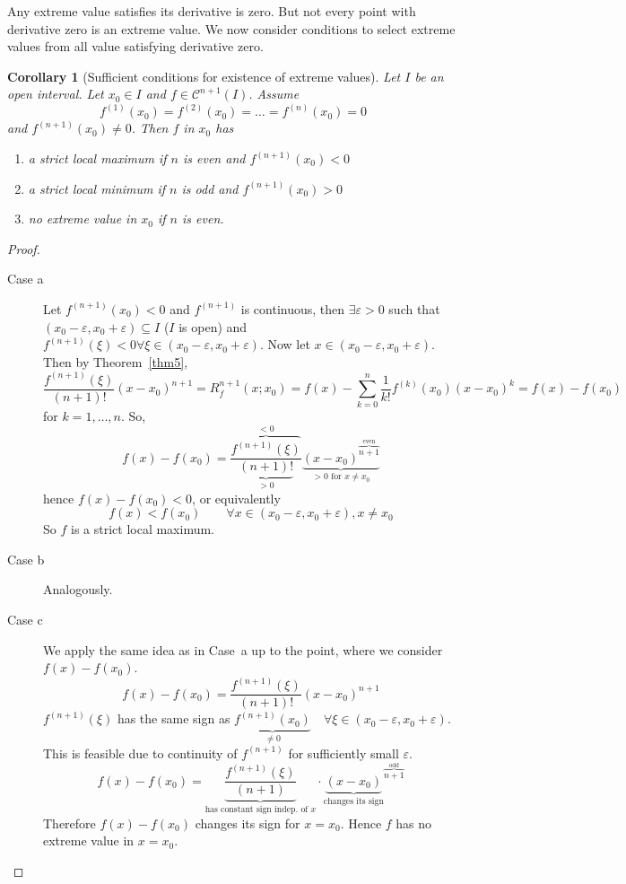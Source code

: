 \documentclass{article}
\newtheorem*{corollary}{Corollary}%
\begin{document}
Any extreme value satisfies its derivative is zero. But not every point with derivative zero is an extreme value.
We now consider conditions to select extreme values from all value satisfying derivative zero.

\begin{corollary}[Sufficient conditions for existence of extreme values]
  Let $I$ be an open interval. Let $x_0 \in I$ and $f \in \mathcal C^{n+1}(I)$. Assume
  \[ f^{(1)}(x_0) = f^{(2)}(x_0) = \dots = f^{(n)}(x_0) = 0 \] %
  and $f^{(n+1)}(x_0) \neq 0$. Then $f$ in $x_0$ has
  \begin{enumerate}
    \item a strict local maximum if $n$ is even and $f^{(n+1)}(x_0) < 0$
    \item a strict local minimum if $n$ is odd and $f^{(n+1)}(x_0) > 0$
    \item no extreme value in $x_0$ if $n$ is even.
  \end{enumerate}
\end{corollary}

\begin{proof}
  \begin{description}
    \item[Case a]
      Let $f^{(n+1)}(x_0) < 0$ and $f^{(n+1)}$ is continuous,
      then $\exists \varepsilon > 0$ such that $(x_0 - \varepsilon, x_0 + \varepsilon) \subseteq I$ ($I$ is open)
      and $f^{(n+1)}(\xi) < 0 \forall \xi \in (x_0 - \varepsilon, x_0 + \varepsilon)$.
      Now let $x \in (x_0 - \varepsilon, x_0 + \varepsilon)$.
      Then by Theorem~\ref{thm5},
      \[ \frac{f^{(n+1)}(\xi)}{(n+1)!} (x - x_0)^{n+1} = R_f^{n+1}(x; x_0) = f(x) - \sum_{k=0}^n \frac{1}{k!} f^{(k)}(x_0) (x - x_0)^k = f(x) - f(x_0) \]
      for $k = 1, \dots, n$. So,
      \[ f(x) - f(x_0) = \frac{\overbrace{f^{(n+1)}(\xi)}^{< 0}}{\underbrace{(n+1)!}_{> 0}} \underbrace{(x - x_0)^{\overbrace{n+1}^{\text{even}}}}_{> 0 \text{ for } x \neq x_0} \]
      hence $f(x) - f(x_0) < 0$, or equivalently
      \[ f(x) < f(x_0) \qquad \forall x \in (x_0 - \varepsilon, x_0 + \varepsilon), x \neq x_0 \]
      So $f$ is a strict local maximum.
    \item[Case b] Analogously.
    \item[Case c] We apply the same idea as in Case~a up to the point, where we consider $f(x) - f(x_0)$.
      \[ f(x) - f(x_0) = \frac{f^{(n+1)}(\xi)}{(n+1)!} (x - x_0)^{n+1} \]
      $f^{(n+1)}(\xi)$ has the same sign as $\underbrace{f^{(n+1)}(x_0)}_{\neq 0} \quad \forall \xi \in (x_0 - \varepsilon, x_0 + \varepsilon)$.
      This is feasible due to continuity of $f^{(n+1)}$ for sufficiently small $\varepsilon$.
      \[
        f(x) - f(x_0)
        = \underbrace{\frac{f^{(n+1)}(\xi)}{(n+1)}}_{\text{has constant sign indep. of } x} \cdot {\underbrace{(x - x_0)}_{\text{changes its sign}}}^{\overbrace{n+1}^{\text{odd}}}
      \]
      Therefore $f(x) - f(x_0)$ changes its sign for $x = x_0$. Hence $f$ has no extreme value in $x = x_0$.
  \end{description}
\end{proof}
\end{document}
